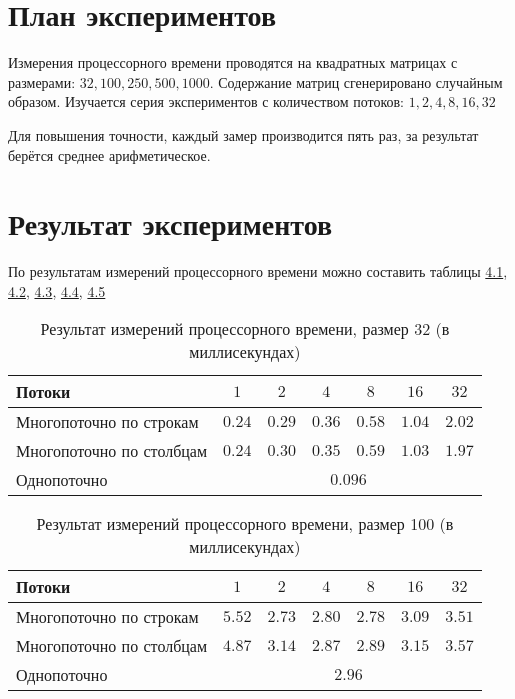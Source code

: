 \section{План экспериментов}
Измерения процессорного времени проводятся на квадратных матрицах с размерами: $32, 100, 250, 500, 1000$. Содержание матриц сгенерировано случайным образом. Изучается серия экспериментов с количеством потоков: $1, 2, 4, 8, 16, 32$

Для повышения точности, каждый замер производится пять раз, за результат берётся среднее арифметическое.

\section{Результат экспериментов}
По результатам измерений процессорного времени можно составить таблицы 
\hyperref[table_4_1]{4.1},
\hyperref[table_4_2]{4.2},
\hyperref[table_4_3]{4.3},
\hyperref[table_4_4]{4.4},
\hyperref[table_4_5]{4.5}

\begin{table}[h] \label{table_4_1}
\caption{Результат измерений процессорного времени, размер 32 (в миллисекундах)}
\begin{tabular}{| p{5.0cm} | c | c | c | c | c | c |}
	\hline
	Потоки						&$1$	&$2$	&$4$	&$8$	&$16$	&$32$	\\
	\hline\hline
	Многопоточно по строкам		&$0.24$	&$0.29$	&$0.36$	&$0.58$	&$1.04$	&$2.02$	\\
	\hline
	Многопоточно по столбцам	&$0.24$	&$0.30$	&$0.35$	&$0.59$	&$1.03$	&$1.97$	\\
	\hline
	Однопоточно					&\multicolumn{6}{|c|}{$0.096$}					\\
	\hline
\end{tabular}
\end{table}

\begin{table}[h] \label{table_4_2}
	\caption{Результат измерений процессорного времени, размер 100 (в миллисекундах)}
	\begin{tabular}{| p{5.0cm} | c | c | c | c | c | c |}
		\hline
		Потоки						&$1$	&$2$	&$4$	&$8$	&$16$	&$32$	\\
		\hline\hline
		Многопоточно по строкам		&$5.52$	&$2.73$	&$2.80$	&$2.78$	&$3.09$	&$3.51$	\\
		\hline
		Многопоточно по столбцам	&$4.87$	&$3.14$	&$2.87$	&$2.89$	&$3.15$	&$3.57$	\\
		\hline
		Однопоточно					&\multicolumn{6}{|c|}{$2.96$}					\\
		\hline
	\end{tabular}
\end{table}

